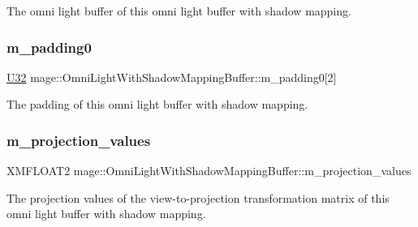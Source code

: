 The omni light buffer of this omni light buffer with shadow mapping. \hypertarget{structmage_1_1_omni_light_with_shadow_mapping_buffer_aaaf8cc62c3bb6607d2efb6c0b5069f87}{}\label{structmage_1_1_omni_light_with_shadow_mapping_buffer_aaaf8cc62c3bb6607d2efb6c0b5069f87} 
\subsubsection{\texorpdfstring{m\+\_\+padding0}{m\_padding0}}
{\footnotesize\ttfamily \hyperlink{namespacemage_a41c104c036fba3756a74e19f793eeaa1}{U32} mage\+::\+Omni\+Light\+With\+Shadow\+Mapping\+Buffer\+::m\+\_\+padding0\mbox{[}2\mbox{]}}

The padding of this omni light buffer with shadow mapping. \hypertarget{structmage_1_1_omni_light_with_shadow_mapping_buffer_afd75d76a4713da8430e0c0080602e0b7}{}\label{structmage_1_1_omni_light_with_shadow_mapping_buffer_afd75d76a4713da8430e0c0080602e0b7} 
\subsubsection{\texorpdfstring{m\+\_\+projection\+\_\+values}{m\_projection\_values}}
{\footnotesize\ttfamily X\+M\+F\+L\+O\+A\+T2 mage\+::\+Omni\+Light\+With\+Shadow\+Mapping\+Buffer\+::m\+\_\+projection\+\_\+values}

The projection values of the view-\/to-\/projection transformation matrix of this omni light buffer with shadow mapping. 